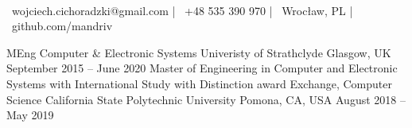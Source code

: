 \documentclass[]{awesome-cv}
\begin{document}
\begin{center}
	  \\
	\vspace{2mm}
	{\faEnvelope\ wojciech.cichoradzki@gmail.com} | {\faMobile\ +48 535 390 970} | {\faMapMarker\ Wrocław, PL} | {\faLink\ github.com/mandriv}
\end{center}
\begin{cventries}
	\cventry
	{MEng Computer \& Electronic Systems}
	{Univeristy of Strathclyde}
	{Glasgow, UK}
	{September 2015 – June 2020}
	{Master of Engineering in Computer and Electronic Systems with International Study with Distinction award}
	\cventry
	{Exchange, Computer Science}
	{California State Polytechnic University}
	{Pomona, CA, USA}
	{August 2018 – May 2019}
	{}
\end{cventries}
\end{document}
